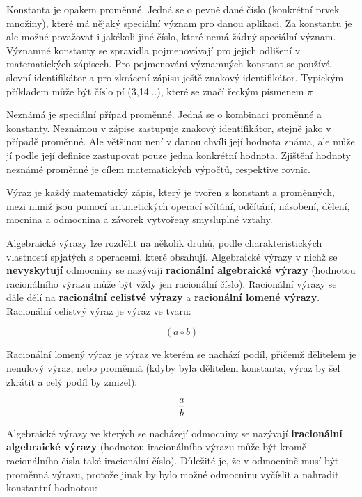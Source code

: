 
Konstanta je opakem proměnné. Jedná se o pevně dané číslo (konkrétní prvek množiny), které má nějaký speciální význam pro danou aplikaci. Za konstantu je ale možné považovat i jakékoli jiné číslo, které nemá žádný speciální význam. Významné konstanty se zpravidla pojmenovávají pro jejich odlišení v matematických zápisech. Pro pojmenování významných konstant se používá slovní identifikátor a pro zkrácení zápisu ještě znakový identifikátor. Typickým příkladem může být číslo pí (3,14...), které se značí řeckým písmenem $\pi$ .


Neznámá je speciální případ proměnné. Jedná se o kombinaci proměnné a konstanty. Neznámou v zápise zastupuje znakový identifikátor, stejně jako v případě proměnné. Ale většinou není v danou chvíli její hodnota známa, ale může jí podle její definice zastupovat pouze jedna konkrétní hodnota. Zjištění hodnoty neznámé proměnné je cílem matematických výpočtů, respektive rovnic.


Výraz je každý matematický zápis, který je tvořen z konstant a proměnných, mezi nimiž jsou pomocí aritmetických operací sčítání, odčítání, násobení, dělení, mocnina a odmocnina a závorek vytvořeny smysluplné vztahy.

Algebraické výrazy lze rozdělit na několik druhů, podle charakteristických vlastností spjatých s operacemi, které obsahují. Algebraické výrazy v nichž se {\bf nevyskytují} odmocniny se nazývají {\bf racionální algebraické výrazy} (hodnotou racionálního výrazu může být vždy jen racionální číslo). Racionální výrazy se dále dělí na {\bf racionální celistvé výrazy} a {\bf racionální lomené výrazy}. Racionální celistvý výraz je výraz ve tvaru:

$$ (a \circ b) $$

Racionální lomený výraz je výraz ve kterém se nachází podíl, přičemž dělitelem je nenulový výraz, nebo proměnná (kdyby byla dělitelem konstanta, výraz by šel zkrátit a celý podíl by zmizel):

$$ {a \over b}$$

Algebraické výrazy ve kterých se nacházejí odmocniny se nazývají {\bf iracionální algebraické výrazy} (hodnotou iracionálního výrazu může být kromě racionálního čísla také iracionální číslo). Důležité je, že v odmocnině musí být proměnná výrazu, protože jinak by bylo možné odmocninu vyčíslit a nahradit konstantní hodnotou:

